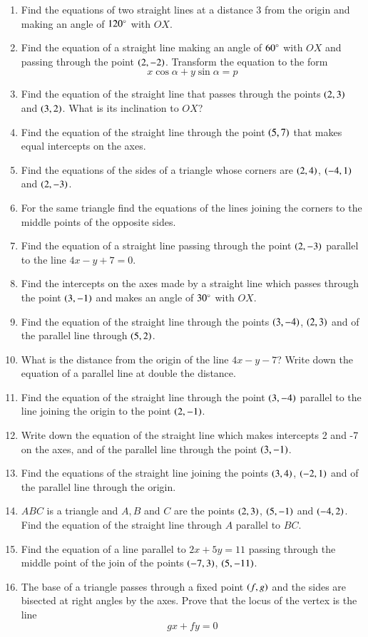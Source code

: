 \begin{enumerate}[1.]
\item Find the equations of two straight lines at a distance 3 from the origin and making an angle of $120 \degree$ with $OX$.
\item Find the equation of a straight line making an angle of $60\degree$ with $OX$ and passing through the point $\left(2,-2\right)$.
Transform the equation to the form
\begin{equation*}
x\cos\alpha + y\sin \alpha = p 
\end{equation*}
\item Find the equation of the straight line that passes through the points $\left(2,3\right)$ and $\left(3,2\right)$. What is its inclination
to $OX$?
\item Find the equation of the straight line through the point $\left(5,7\right)$ that makes equal intercepts on the axes.
\item Find the equations of the sides of a triangle whose corners are $\left(2,4\right)$, $\left(-4,1\right)$ and $\left(2,-3\right)$.
\item For the same triangle find the equations of the lines joining the corners to the middle points of the opposite sides.
\item Find the equation of a straight line passing through the point $\left(2,-3\right)$ parallel to the line $4x-y+7=0$.
\item Find the intercepts on the axes made by a straight line which passes through the point $\left(3,-1\right)$ and makes an angle
of $30\degree$ with $OX$.
\item Find the equation of the straight line through the points $\left(3,-4\right)$, $\left(2,3\right)$ and of the
parallel line through $\left(5,2\right)$.
\item What is the distance from the origin of the line $4x-y-7$? Write down the equation of a parallel line at double the distance.
\item Find the equation of the straight line through the point $\left(3,-4\right)$ parallel to the line joining the origin to the point
$\left(2,-1\right)$.
\item Write down the equation of the straight line which makes intercepts 2 and -7 on the axes, and of the parallel line through
the point $\left(3,-1\right)$.
\item Find the equations of the straight line joining the points $\left(3,4\right)$, $\left(-2,1\right)$ and of the parallel line through
the origin.
\item $ABC$ is a triangle and $A, B$ and $C$ are the points $\left(2,3\right)$, $\left(5,-1\right)$ and $\left(-4,2\right)$.  Find the equation
of the straight line through $A$ parallel to $BC$.
\item Find the equation of a line parallel to $2x+5y=11$ passing through the middle point of the join of the points $\left(-7,3\right)$, $\left(5,-11\right)$.
\item The base of a triangle passes through a fixed point $\left(f,g\right)$ and the sides are bisected at right angles by the axes.  Prove that the locus
of the vertex is the line
\begin{equation*}
gx+fy = 0
\end{equation*}
\end{enumerate}
